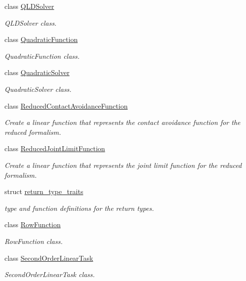 \begin{DoxyCompactItemize}
class \hyperlink{classocra_1_1QLDSolver}{Q\+L\+D\+Solver}
\begin{DoxyCompactList}\small\item\em Q\+L\+D\+Solver class. \end{DoxyCompactList}\item 
class \hyperlink{classocra_1_1QuadraticFunction}{Quadratic\+Function}
\begin{DoxyCompactList}\small\item\em Quadratic\+Function class. \end{DoxyCompactList}\item 
class \hyperlink{classocra_1_1QuadraticSolver}{Quadratic\+Solver}
\begin{DoxyCompactList}\small\item\em Quadratic\+Solver class. \end{DoxyCompactList}\item 
class \hyperlink{classocra_1_1ReducedContactAvoidanceFunction}{Reduced\+Contact\+Avoidance\+Function}
\begin{DoxyCompactList}\small\item\em Create a linear function that represents the contact avoidance function for the reduced formalism. \end{DoxyCompactList}\item 
class \hyperlink{classocra_1_1ReducedJointLimitFunction}{Reduced\+Joint\+Limit\+Function}
\begin{DoxyCompactList}\small\item\em Create a linear function that represents the joint limit function for the reduced formalism. \end{DoxyCompactList}\item 
struct \hyperlink{structocra_1_1return__type__traits}{return\+\_\+type\+\_\+traits}
\begin{DoxyCompactList}\small\item\em type and function definitions for the return types. \end{DoxyCompactList}\item 
class \hyperlink{classocra_1_1RowFunction}{Row\+Function}
\begin{DoxyCompactList}\small\item\em Row\+Function class. \end{DoxyCompactList}\item 
class \hyperlink{classocra_1_1SecondOrderLinearTask}{Second\+Order\+Linear\+Task}
\begin{DoxyCompactList}\small\item\em Second\+Order\+Linear\+Task class. \end{DoxyCompactList}\item 

\end{DoxyCompactItemize}
